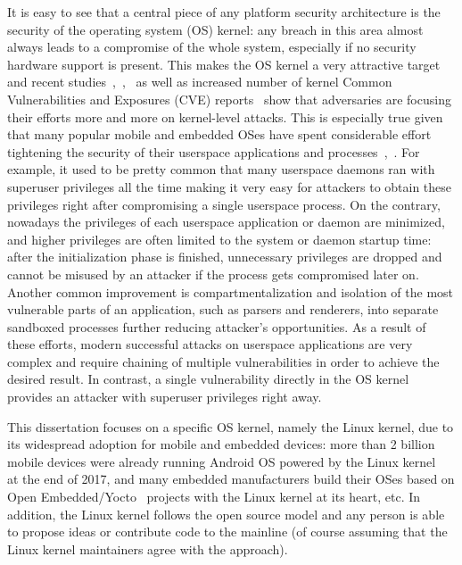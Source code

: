 
It is easy to see that a central piece of any platform security architecture is the security of the operating system (OS) kernel: any breach in this area almost always leads to a compromise of the whole system, especially if no security hardware support is present. This makes the OS kernel a very attractive target and recent studies~\cite{stoep2016android},~\cite{tolvanen2017},~\cite{windowsexploits} as well as increased number of kernel Common Vulnerabilities and Exposures (CVE) reports~\cite{nistCves} show that adversaries are focusing their efforts more and more on kernel-level attacks. This is especially true given that many popular mobile and embedded OSes have spent considerable effort tightening the security of their userspace applications and processes~\cite{stoep2016android},~\cite{tolvanen2017}. For example, it used to be pretty common that many userspace daemons ran with superuser privileges all the time making it very easy for attackers to obtain these privileges right after compromising a single userspace process. On the contrary, nowadays the privileges of each userspace application or daemon are minimized, and higher privileges are often limited to the system or daemon startup time: after the initialization phase is finished, unnecessary privileges are dropped and cannot be misused by an attacker if the process gets compromised later on. Another common improvement is compartmentalization and isolation of the most vulnerable parts of an application, such as parsers and renderers, into separate sandboxed processes further reducing attacker's opportunities. As a result of these efforts, modern successful attacks on userspace applications are very complex and require chaining of multiple vulnerabilities in order to achieve the desired result. In contrast, a single vulnerability directly in the OS kernel provides an attacker with superuser privileges right away.

This dissertation focuses on a specific OS kernel, namely the Linux kernel, due to its widespread adoption for mobile and embedded devices: more than 2 billion mobile devices were already running Android OS powered by the Linux kernel~\cite{googleio2017} at the end of 2017, and many embedded manufacturers build their OSes based on Open Embedded/Yocto~\cite{OE2017, yocto2017} projects with the Linux kernel at its heart, etc. 
In addition, the Linux kernel follows the open source model and any person is able to propose ideas or contribute code to the mainline (of course assuming that the Linux kernel maintainers agree with the approach).

